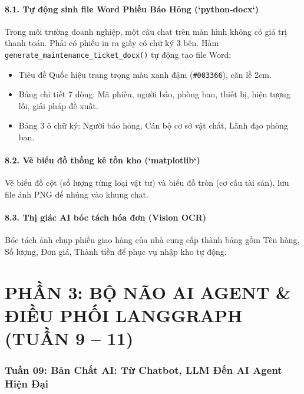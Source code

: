 \documentclass[11pt,a4paper]{article}
\begin{document}
\subsection{8.1. Tự động sinh file Word Phiếu Báo Hỏng (`python-docx`)}
Trong môi trường doanh nghiệp, một câu chat trên màn hình không có giá trị thanh toán. Phải có phiếu in ra giấy có chữ ký 3 bên. Hàm \texttt{generate\_maintenance\_ticket\_docx()} tự động tạo file Word:
\begin{itemize}
    \item Tiêu đề Quốc hiệu trang trọng màu xanh đậm (\texttt{\#003366}), căn lề 2cm.
    \item Bảng chi tiết 7 dòng: Mã phiếu, người báo, phòng ban, thiết bị, hiện tượng lỗi, giải pháp đề xuất.
    \item Bảng 3 ô chữ ký: Người báo hỏng, Cán bộ cơ sở vật chất, Lãnh đạo phòng ban.
\end{itemize}

\subsection{8.2. Vẽ biểu đồ thống kê tồn kho (`matplotlib`)}
Vẽ biểu đồ cột (số lượng từng loại vật tư) và biểu đồ tròn (cơ cấu tài sản), lưu file ảnh PNG để nhúng vào khung chat.

\subsection{8.3. Thị giác AI bóc tách hóa đơn (Vision OCR)}
Bóc tách ảnh chụp phiếu giao hàng của nhà cung cấp thành bảng gồm Tên hàng, Số lượng, Đơn giá, Thành tiền để phục vụ nhập kho tự động.

\newpage

\part*{\Large \color{blue!85!black} PHẦN 3: BỘ NÃO AI AGENT \& ĐIỀU PHỐI LANGGRAPH (TUẦN 9 -- 11)}

\section{Tuần 09: Bản Chất AI: Từ Chatbot, LLM Đến AI Agent Hiện Đại}
\end{document}
